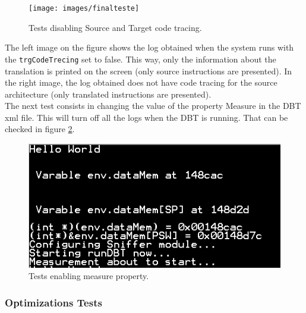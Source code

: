 \begin{figure}[H]
\centerline{
\texttt{[image: images/finalteste]}
}
\caption{Tests disabling Source and Target code tracing.}
\label{fig:finalteste}
\end{figure}


The left image on the figure shows the log obtained when the system runs with the \texttt{trgCodeTrecing} set to false. This way, only the information about the translation is printed on the screen (only source instructions are presented). In the right image, the log obtained does not have code tracing for the source architecture (only translated instructions are presented). \\

The next test consists in changing the value of the property Measure in the DBT xml file. This will turn off all the logs when the DBT is running. That can be checked in figure \ref{fig:val4}.

\begin{figure}[H]
\centerline{
\includegraphics[scale=0.6]{images/val4}
}
\caption{Tests enabling measure property.}
\label{fig:val4}
\end{figure}

\subsubsection{Optimizations Tests}

